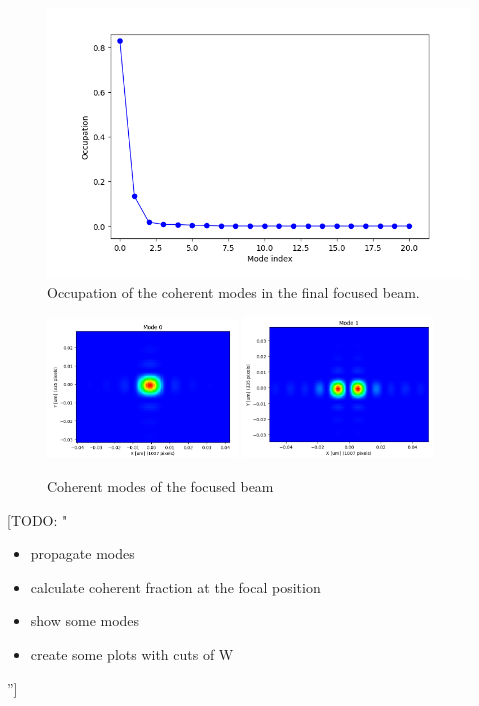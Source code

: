 \documentclass{iucr}              %
\newcommand{\todo}[1]{{\color{red}[TODO: "#1'']}}
\begin{document}
\begin{figure}\label{fig:rediagonalization}
    \centering
        \includegraphics[width=\textwidth]{GRAPHICS/rediagonalization.png}
    
    \caption{Occupation of the coherent modes in the final focused beam.}
\end{figure}

\begin{figure}\label{fig:final modes}
    \centering
        \includegraphics[width=0.45\textwidth]{GRAPHICS/final_mode0.png}
        \includegraphics[width=0.45\textwidth]{GRAPHICS/final_mode1.png}
    \caption{Coherent modes of the focused beam}
\end{figure}


\todo{
\begin{itemize}
 \item propagate modes
 \item calculate coherent fraction at the focal position
 \item show some modes
 \item create some plots with cuts of W
\end{itemize}
}
 
\end{document}
